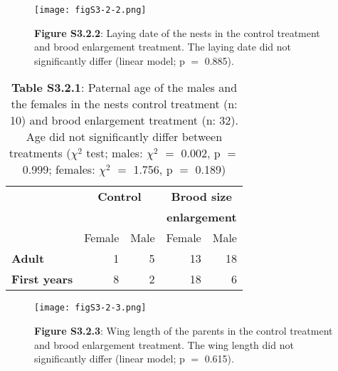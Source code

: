\documentclass[10pt, twoside]{book} %
\begin{document}
\begin{figure}[b]
	\begin{center}
		\texttt{[image: figS3-2-2.png]}
	\end{center}
\caption*{\textbf{Figure S3.2.2}: Laying date of the nests in the control treatment and brood enlargement treatment. The laying date did not significantly differ (linear model; p $=$ 0.885).}
\end{figure}


\begin{table}[h]
	\begin{center}
		\begin{footnotesize}
			\caption*{\textbf{Table S3.2.1}: Paternal age of the males and the females in the nests control treatment (n: 10) and brood enlargement treatment (n: 32). Age did not significantly differ between treatments ($\chi^2$ test; males: $\chi^2$ $=$ 0.002, p $=$ 0.999; females: $\chi^2$ $=$ 1.756, p $=$ 0.189)} 
			
			\begingroup
			\setlength{\tabcolsep}{8pt} %
			\renewcommand{\arraystretch}{1.5} %
			\begin{tabular}{l r r r r}
				
				\toprule
				& \multicolumn{2}{c}{\textbf{Control}} & \multicolumn{2}{c}{\textbf{Brood size}}\\
				&&& \multicolumn{2}{c}{\textbf{enlargement}}\\
				\cmidrule(r){2-3} \cmidrule(r){4-5}
				& Female & Male & Female & Male\\
				\hline
				\textbf{Adult} & 1 & 5 & 13 &18\\
				\textbf{First years} & 8 & 2 & 18 &6 \\
				\bottomrule
			\end{tabular}\endgroup
		\end{footnotesize}
	\end{center}
\end{table}


\begin{figure}[h]
	\begin{center}
		\texttt{[image: figS3-2-3.png]}
	\end{center}
	\caption*{\textbf{Figure S3.2.3}: Wing length of the parents in the control treatment and brood enlargement treatment. The wing length did not significantly differ (linear model; p $=$ 0.615).}
\end{figure}
\end{document}
